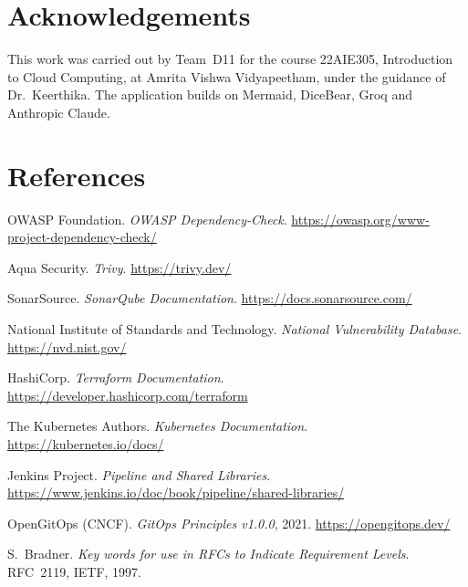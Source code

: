 \documentclass[11pt,a4paper]{article}
\begin{document}
\section*{Acknowledgements}
This work was carried out by Team~D11 for the course 22AIE305, Introduction
to Cloud Computing, at Amrita Vishwa Vidyapeetham, under the guidance of
Dr.~Keerthika. The application builds on Mermaid, DiceBear, Groq and
Anthropic Claude.

\section*{References}
\begin{enumerate}[nosep,label={[\arabic*]}]
    \item OWASP Foundation. \emph{OWASP Dependency-Check}.
        \url{https://owasp.org/www-project-dependency-check/}
    \item Aqua Security. \emph{Trivy}. \url{https://trivy.dev/}
    \item SonarSource. \emph{SonarQube Documentation}.
        \url{https://docs.sonarsource.com/}
    \item National Institute of Standards and Technology. \emph{National
        Vulnerability Database}. \url{https://nvd.nist.gov/}
    \item HashiCorp. \emph{Terraform Documentation}.
        \url{https://developer.hashicorp.com/terraform}
    \item The Kubernetes Authors. \emph{Kubernetes Documentation}.
        \url{https://kubernetes.io/docs/}
    \item Jenkins Project. \emph{Pipeline and Shared Libraries}.
        \url{https://www.jenkins.io/doc/book/pipeline/shared-libraries/}
    \item OpenGitOps (CNCF). \emph{GitOps Principles v1.0.0}, 2021.
        \url{https://opengitops.dev/}
    \item S.~Bradner. \emph{Key words for use in RFCs to Indicate
        Requirement Levels}. RFC~2119, IETF, 1997.
\end{enumerate}
\end{document}
